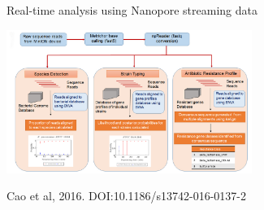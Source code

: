 \documentclass{beamer}
\begin{document}
{
\begin{frame}[plain]
\end{frame}
}
%
\begin{frame}{Real-time analysis using Nanopore streaming data}
  \begin{center}
  \includegraphics[width=0.6\textwidth]{realtime.jpg}  
   
 \vspace*{0.3cm}
Cao et al, 2016. DOI:10.1186/s13742-016-0137-2
 \end{center}
\end{frame}
\end{document}
